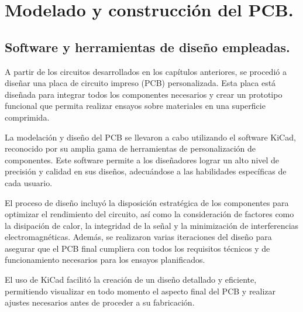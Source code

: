 \chapter{Modelado y construcción del PCB.}

\label{C:EModelado y construcción del PCB.}

\section{Software y herramientas de diseño empleadas.}

A partir de los circuitos desarrollados en los capítulos anteriores, se procedió a diseñar una placa de circuito impreso (PCB) personalizada. Esta placa está diseñada para integrar todos los componentes necesarios y crear un prototipo funcional que permita realizar ensayos sobre materiales en una superficie comprimida. \par 
La modelación y diseño del PCB se llevaron a cabo utilizando el software KiCad, reconocido por su amplia gama de herramientas de personalización de componentes. Este software permite a los diseñadores lograr un alto nivel de precisión y calidad en sus diseños, adecuándose a las habilidades específicas de cada usuario.\cite{kicad} \par 
El proceso de diseño incluyó la disposición estratégica de los componentes para optimizar el rendimiento del circuito, así como la consideración de factores como la disipación de calor, la integridad de la señal y la minimización de interferencias electromagnéticas. Además, se realizaron varias iteraciones del diseño para asegurar que el PCB final cumpliera con todos los requisitos técnicos y de funcionamiento necesarios para los ensayos planificados. \par 
El uso de KiCad facilitó la creación de un diseño detallado y eficiente, permitiendo visualizar en todo momento el aspecto final del PCB y realizar ajustes necesarios antes de proceder a su fabricación.


